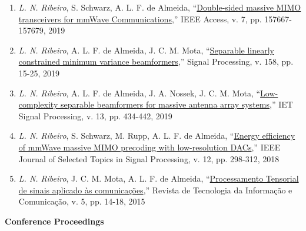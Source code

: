 \begin{enumerate}
	\item \emph{L. N. Ribeiro}, S. Schwarz, A. L. F. de Almeida, ``\href{https://doi.org/10.1109/ACCESS.2019.2949945}{Double-sided massive MIMO transceivers for mmWave Communications},'' IEEE Access, v. 7, pp. 157667-157679, 2019
	
	\item \emph{L. N. Ribeiro}, A. L. F. de Almeida, J. C. M. Mota, ``\href{https://doi.org/10.1016/j.sigpro.2018.12.010}{Separable linearly constrained minimum variance beamformers},'' Signal Processing, v. 158, pp. 15-25, 2019
	
	\item \emph{L. N. Ribeiro}, A. L. F. de Almeida, J. A. Nossek, J. C. M. Mota, ``\href{https://doi.org/10.1049/iet-spr.2018.5115}{Low-complexity separable beamformers for massive antenna array systems},'' IET Signal Processing, v. 13, pp. 434-442, 2019
	
	\item \emph{L. N. Ribeiro}, S. Schwarz, M. Rupp, A. L. F. de Almeida, ``\href{https://doi.org/10.1109/JSTSP.2018.2824762}{Energy efficiency of mmWave massive MIMO precoding with low-resolution DACs},'' IEEE Journal of Selected Topics in Signal Processing, v. 12, pp. 298-312, 2018
	
	\item \emph{L. N. Ribeiro}, J. C. M. Mota, A. L. F. de Almeida, ``\href{http://rtic.com.br/index.php/rtic/article/view/65}{Processamento Tensorial de sinais aplicado às comunicações},'' Revista de Tecnologia da Informação e Comunicação, v. 5, pp. 14-18, 2015
\end{enumerate}

\newpage 

{\bf Conference Proceedings}\\

